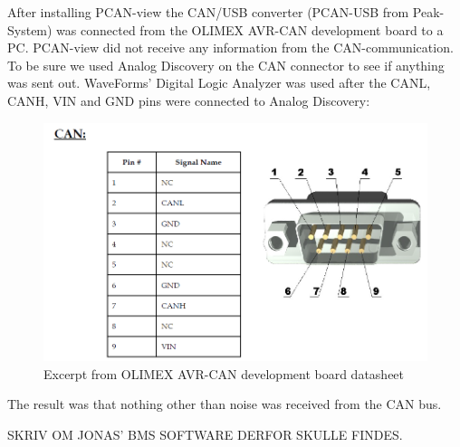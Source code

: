 After installing PCAN-view the CAN/USB converter (PCAN-USB from Peak-System) was connected from the OLIMEX AVR-CAN development board to a PC. PCAN-view did not receive any information from the CAN-communication. To be sure we used Analog Discovery on the CAN connector to see if anything was sent out. WaveForms' Digital Logic Analyzer was used after the CANL, CANH, VIN and GND pins were connected to Analog Discovery:\\
\begin{figure}[H]
	\centering
	\includegraphics[width=0.5\linewidth]{Software/SnipFromOlimexDatasheet.PNG}
	\caption{Excerpt from OLIMEX AVR-CAN development board datasheet}
	\label{fig:OLIMEX_AVR-CAN_BMS}
\end{figure}

The result was that nothing other than noise was received from the CAN bus.

SKRIV OM JONAS' BMS SOFTWARE DERFOR SKULLE FINDES.